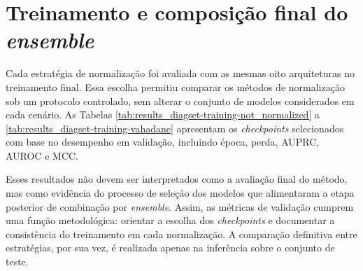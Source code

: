 \section{Treinamento e composição final do \textit{ensemble}}
\label{sec:res_diagset_treinamento}

Cada estratégia de normalização foi avaliada com as mesmas oito arquiteturas no treinamento final. Essa escolha permitiu comparar os métodos de normalização sob um protocolo controlado, sem alterar o conjunto de modelos considerados em cada cenário. As Tabelas \ref{tab:results_diagset-training-not_normalized} a \ref{tab:results_diagset-training-vahadane} apresentam os \textit{checkpoints} selecionados com base no desempenho em validação, incluindo época, perda, AUPRC, AUROC e MCC.

Esses resultados não devem ser interpretados como a avaliação final do método, mas como evidência do processo de seleção dos modelos que alimentaram a etapa posterior de combinação por \textit{ensemble}. Assim, as métricas de validação cumprem uma função metodológica: orientar a escolha dos \textit{checkpoints} e documentar a consistência do treinamento em cada normalização. A comparação definitiva entre estratégias, por sua vez, é realizada apenas na inferência sobre o conjunto de teste.

\begin{table}[!htb]
\centering
\caption{Resultados de validação dos \textit{checkpoints} sem normalização de cor em DIAGSET.}
\label{tab:results_diagset-training-not_normalized}
\scriptsize
{}
\end{table}



